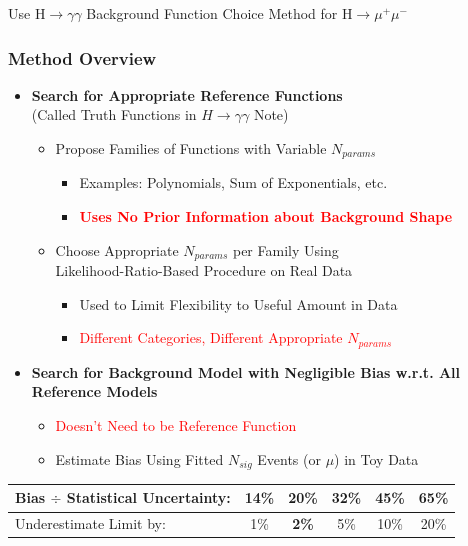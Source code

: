 \documentclass{beamer}
\newcommand{\tredbf}[1]{\textcolor{red}{\bf #1}}
\begin{document}

\begin{frame}
  \begin{center}
    \Huge
    Use $\mathrm{H} \rightarrow \gamma\gamma$ Background Function Choice Method for $\mathrm{H} \rightarrow \mu^+\mu^-$
  \end{center}
\end{frame}

\begin{frame}
\frametitle{Method Overview}
  \begin{itemize}
    \item {\bf Search for Appropriate Reference Functions} \\ (Called Truth Functions in $H\rightarrow\gamma\gamma$ Note)
      \begin{itemize}
        \item Propose Families of Functions with Variable $N_{params}$
          \begin{itemize}
              \item Examples: Polynomials, Sum of Exponentials, etc.
              \item \tredbf{Uses No Prior Information about Background Shape}
          \end{itemize}
        \item Choose Appropriate $N_{params}$ per Family Using \\ 
                  Likelihood-Ratio-Based Procedure on Real Data
          \begin{itemize}
              \item Used to Limit Flexibility to Useful Amount in Data
              \item \textcolor{red}{ Different Categories, Different Appropriate $N_{params}$}
          \end{itemize}
      \end{itemize}
    \item {\bf Search for Background Model with Negligible Bias w.r.t. All Reference Models}
    \begin{itemize}
      \item \textcolor{red}{Doesn't Need to be Reference Function}
      \item Estimate Bias Using Fitted $N_{sig}$ Events (or $\mu$) in Toy Data
    \end{itemize}
  \end{itemize}
\begin{center}
  \small
  \begin{tabular}{|l|c|c|c|c|c|} \hline
    Bias $\div$ Statistical Uncertainty: & 14\% & \textbf{20\%} & 32\% & 45\% & 65\% \\ \hline
    Underestimate Limit by: & 1\% & \textbf{2\%} & 5\% & 10\% & 20\% \\ \hline
  \end{tabular}
\end{center}
\end{frame}
\end{document}
